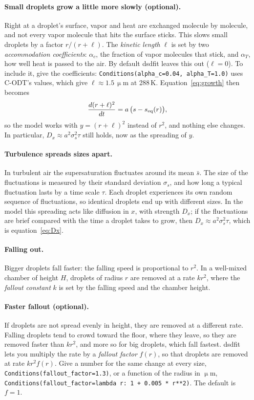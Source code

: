 \documentclass[11pt]{article}
\newcommand{\um}{\ensuremath{\,\upmu\mathrm{m}}\xspace}
\newcommand{\sbar}{\bar s}
\newcommand{\Dx}{D_x}
\newcommand{\code}[1]{\texttt{#1}}
\begin{document}
\paragraph{Small droplets grow a little more slowly (optional).} Right at a droplet's surface, vapor and
heat are exchanged molecule by molecule, and not every vapor molecule that hits the surface sticks. This
slows small droplets by a factor $r/(r+\ell)$. The \emph{kinetic length} $\ell$ is set by two
\emph{accommodation coefficients}: $\alpha_c$, the fraction of vapor molecules that stick, and $\alpha_T$,
how well heat is passed to the air. By default dsdfit leaves this out ($\ell = 0$). To include it, give the
coefficients: \code{Conditions(alpha\_c=0.04, alpha\_T=1.0)} uses C-ODT's values, which give
$\ell \approx 1.5\um$ at 288\,K. Equation~\eqref{eq:growth} then becomes
\begin{equation*}
\frac{d(r+\ell)^2}{dt} = a\,\big(s - s_{\rm eq}(r)\big),
\end{equation*}
so the model works with $y = (r+\ell)^2$ instead of $r^2$, and nothing else changes. In particular,
$\Dx \approx a^2\sigma_s^2\tau$ still holds, now as the spreading of $y$.

\paragraph{Turbulence spreads sizes apart.} In turbulent air the supersaturation fluctuates around its mean
$\sbar$. The size of the fluctuations is measured by their standard deviation $\sigma_s$, and how long a
typical fluctuation lasts by a time scale $\tau$. Each droplet experiences its own random sequence of
fluctuations, so identical droplets end up with different sizes. In the model this spreading acts like
diffusion in $x$, with strength $\Dx$; if the fluctuations are brief compared with the time a droplet takes
to grow, then $\Dx \approx a^2\sigma_s^2\tau$, which is equation~\eqref{eq:Dx}.

\paragraph{Falling out.} Bigger droplets fall faster: the falling speed is proportional to $r^2$. In a
well-mixed chamber of height $H$, droplets of radius $r$ are removed at a rate $k r^2$, where the
\emph{fallout constant} $k$ is set by the falling speed and the chamber height.

\paragraph{Faster fallout (optional).} If droplets are not spread evenly in height, they are removed at a
different rate. Falling droplets tend to crowd toward the floor, where they leave, so they are removed
faster than $k r^2$, and more so for big droplets, which fall fastest. dsdfit lets you multiply the rate by a
\emph{fallout factor} $f(r)$, so that droplets are removed at rate $k r^2 f(r)$. Give a number for the same
change at every size, \code{Conditions(fallout\_factor=1.3)}, or a function of the radius in $\upmu$m,
\code{Conditions(fallout\_factor=lambda r: 1 + 0.005 * r**2)}. The default is $f = 1$.
\end{document}

